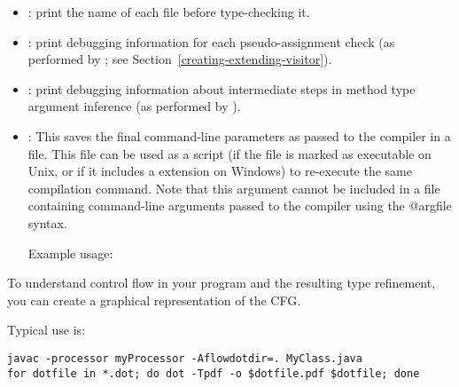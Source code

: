 
\begin{itemize}

\item {}: print the name of each file before type-checking it.

\item {}: print debugging information for each
pseudo-assignment check (as performed by
; see
Section~\ref{creating-extending-visitor}).

\item {}: print debugging information
about intermediate steps in method type argument inference
(as performed by ).

\end{itemize}


\begin{itemize}

\item {}:
  This saves the final command-line parameters as passed to the compiler in a file.
  This file can be used as a script (if the file is marked as executable on Unix, or
  if it includes a  extension on Windows) to re-execute the same compilation command.
  Note that this argument cannot be included in a file containing command-line arguments
  passed to the compiler using the @argfile syntax.

  Example usage: 

\end{itemize}


To understand control flow in your program and the resulting type
refinement, you can create a graphical representation of the CFG.

Typical use is:

\begin{Verbatim}
javac -processor myProcessor -Aflowdotdir=. MyClass.java
for dotfile in *.dot; do dot -Tpdf -o $dotfile.pdf $dotfile; done
\end{Verbatim}

